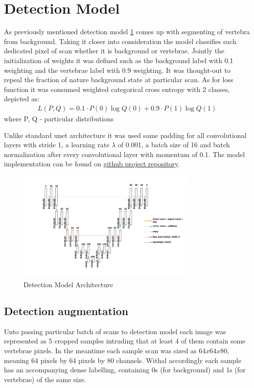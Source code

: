 \section{Detection Model}
As previously mentioned detection model \ref{fig:detection_model} comes up with segmenting of vertebra from background. Taking it closer into consideration the model classifies each dedicated pixel of scan whether it is background or vertebrae. Jointly the initialization of weights it was  defined such as the background label with 0.1 weighting and the vertebrae label with 0.9 weighting. It was thought-out to repeal the fraction of nature background state at particular scan. As for loss function it was consumed \cite{Zhang2018} weighted categorical cross entropy with 2 classes, depicted as:
\begin{align*}
 L(P, Q) = 0.1 \cdot P(0)\log Q(0) + 0.9 \cdot P(1)\log Q(1)
\end{align*}
where P, Q - particular distributions 

Unlike standard unet architecture it was used same padding for all convolutional layers with stride 1, a learning rate
$\lambda$ of 0.001, a batch size of 16 and batch normalization after every convolutional layer with momentum of 0.1. The model implementation can be found on \href{https://github.com/KumundzhievMaxim/VertebraeSegmentation/blob/main/train_detection_model.py}{\color{blue} github project repository}. 

\begin{figure}[h]
    \centering \includegraphics[width=9cm]{images/detection_model.png}
    \caption {Detection Model Architecture}
    \label{fig:detection_model}
\end{figure}
 
\subsection{Detection augmentation}
Unto passing particular batch of scans to detection model each image was represented as 5 cropped samples intruding that at least 4 of them contain some vertebrae pixels. In the meantime each sample scan was sized as $64x64x80$, meaning 64 pixels by 64 pixels by 80 channels. Withal accordingly each sample has an accompanying dense labelling, containing 0s (for background) and 1s (for vertebrae) of the same size.    
 
